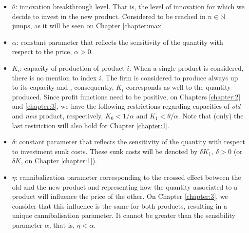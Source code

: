 \begin{itemize}
	\item $\theta$: innovation breakthrough level. That is, the level of innovation for which we decide to invest in the new product. Considered to be reached in $n \in \mathds{N}$ jumps, as it will be seen on Chapter \ref{chapter:max}.
	
	\item $\alpha$: constant parameter that reflects the sensitivity of the quantity with respect to the price, $\alpha>0$.
	
	\item $K_i$: capacity of production of product $i$. When a single product is considered, there is no mention to index $i$. The firm is considered to produce always up to its capacity and , consequently, $K_i$ corresponds as well to the quantity produced. Since profit functions need to be positive, on Chapters \ref{chapter:2} and \ref{chapter:3}, we have the following restrictions regarding capacities of \textit{old} and \textit{new} product, respectively, $K_0<1/\alpha$ and $K_1<\theta/\alpha$. Note that (only) the last restriction will also hold for Chapter \ref{chapter:1}.
	
	\item $\delta$: constant parameter that reflects the sensitivity of the quantity with respect to investment sunk costs. These sunk costs will be denoted by $\delta K_1, \  \delta>0$ (or $\delta K$, on Chapter \ref{chapter:1}).
	
	\item $\eta$: cannibalization parameter corresponding to the crossed effect between the old and the new product and representing how the quantity associated to a product will influence the price of the other. On Chapter \ref{chapter:3}, we consider that this influence is the same for both products, resulting in a unique cannibalisation parameter. It cannot be greater than the sensibility parameter $\alpha$, that is, $\eta <\alpha$.
\end{itemize}